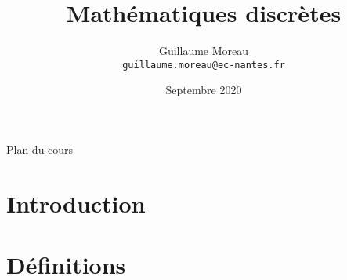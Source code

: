 \documentclass[allowframebreaks,xcolor=dvipsnames]{beamer}
\title[Option INFO / MADIS] %
{Mathématiques discrètes}
\author[G. Moreau]{Guillaume Moreau\\
\texttt{guillaume.moreau@ec-nantes.fr}}
\institute[Ecole Centrale de Nantes] %
{
  Ecole Centrale de Nantes
}
\date %
{Septembre 2020}
\begin{document}
\begin{frame}
  \titlepage
\end{frame}

\begin{frame}[allowframebreaks]{Plan du cours}
  \tableofcontents[hideallsubsections]
\end{frame}



\section{Introduction}


\section{Définitions}




\end{document}
